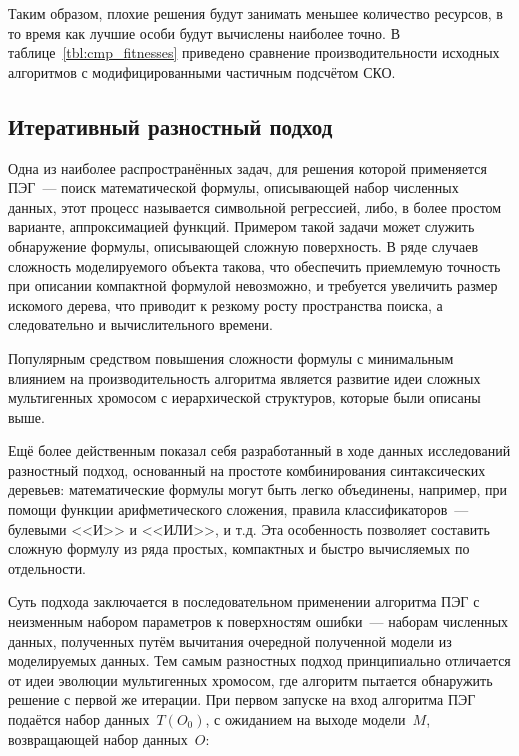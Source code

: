 Таким образом, плохие решения будут занимать меньшее количество ресурсов, в то время как лучшие особи будут вычислены наиболее точно. В таблице~\ref{tbl:cmp_fitnesses} приведено сравнение производительности исходных алгоритмов с модифицированными частичным подсчётом СКО.






\subsection{Итеративный разностный подход}

Одна из наиболее распространённых задач, для решения которой применяется ПЭГ~--- поиск математической формулы, описывающей набор численных данных, этот процесс называется символьной регрессией, либо, в более простом варианте, аппроксимацией функций. Примером такой задачи может служить обнаружение формулы, описывающей сложную поверхность. В ряде случаев сложность моделируемого объекта такова, что обеспечить приемлемую точность при описании компактной формулой невозможно, и требуется увеличить размер искомого дерева, что приводит к резкому росту пространства поиска, а следовательно и вычислительного времени.

Популярным средством повышения сложности формулы с минимальным влиянием на производительность алгоритма является развитие идеи сложных мультигенных хромосом с иерархической структуров, которые были описаны выше.

Ещё более действенным показал себя разработанный в ходе данных исследований разностный подход, основанный на простоте комбинирования синтаксических деревьев: математические формулы могут быть легко объединены, например, при помощи функции арифметического сложения, правила классификаторов~--- булевыми <<И>> и <<ИЛИ>>, и т.д. Эта особенность позволяет составить сложную формулу из ряда простых, компактных и быстро вычисляемых по отдельности.

Суть подхода заключается в последовательном применении алгоритма ПЭГ с неизменным набором параметров к поверхностям ошибки~--- наборам численных данных, полученных путём вычитания очередной полученной модели из моделируемых данных. Тем самым разностных подход принципиально отличается от идеи эволюции мультигенных хромосом, где алгоритм пытается обнаружить решение с первой же итерации. При первом запуске на вход алгоритма ПЭГ подаётся набор данных~$T(O_{0})$, с ожиданием на выходе модели~$M$, возвращающей набор данных~$O$:

